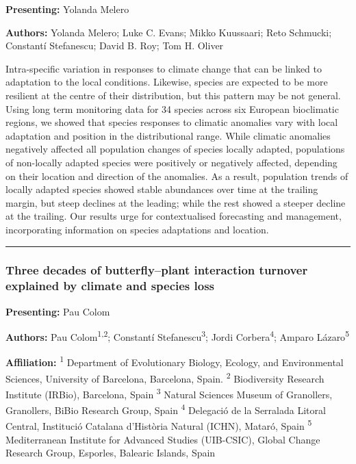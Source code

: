\documentclass[
  letterpaper,
  DIV=11,
  numbers=noendperiod]{scrartcl}
\begin{document}
\textbf{Presenting:} Yolanda Melero

\textbf{Authors:} Yolanda Melero; Luke C. Evans; Mikko Kuussaari; Reto
Schmucki; Constantí Stefanescu; David B. Roy; Tom H. Oliver

Intra-specific variation in responses to climate change that can be
linked to adaptation to the local conditions. Likewise, species are
expected to be more resilient at the centre of their distribution, but
this pattern may be not general. Using long term monitoring data for 34
species across six European bioclimatic regions, we showed that species
responses to climatic anomalies vary with local adaptation and position
in the distributional range. While climatic anomalies negatively
affected all population changes of species locally adapted, populations
of non-locally adapted species were positively or negatively affected,
depending on their location and direction of the anomalies. As a result,
population trends of locally adapted species showed stable abundances
over time at the trailing margin, but steep declines at the leading;
while the rest showed a steeper decline at the trailing. Our results
urge for contextualised forecasting and management, incorporating
information on species adaptations and location.

\begin{center}\rule{0.5\linewidth}{0.5pt}\end{center}

\subsubsection{Three decades of butterfly--plant interaction turnover
explained by climate and species
loss}\label{three-decades-of-butterflyplant-interaction-turnover-explained-by-climate-and-species-loss}

\textbf{Presenting:} Pau Colom

\textbf{Authors:} Pau Colom\textsuperscript{1,2}; Constantí
Stefanescu\textsuperscript{3}; Jordi Corbera\textsuperscript{4}; Amparo
Lázaro\textsuperscript{5}

\textbf{Affiliation:} \textsuperscript{1} Department of Evolutionary
Biology, Ecology, and Environmental Sciences, University of Barcelona,
Barcelona, Spain. \textsuperscript{2} Biodiversity Research Institute
(IRBio), Barcelona, Spain \textsuperscript{3} Natural Sciences Museum of
Granollers, Granollers, BiBio Research Group, Spain \textsuperscript{4}
Delegació de la Serralada Litoral Central, Institució Catalana
d'Història Natural (ICHN), Mataró, Spain \textsuperscript{5}
Mediterranean Institute for Advanced Studies (UIB-CSIC), Global Change
Research Group, Esporles, Balearic Islands, Spain
\end{document}
